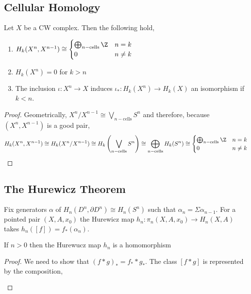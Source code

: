 \documentclass[12pt]{extarticle}
\begin{document}
\subsection{Cellular Homology}

\begin{lemma}
Let $X$ be a CW complex. Then the following hold,
\begin{enumerate}
\item $H_k (X^n, X^{n-1}) \cong
\begin{cases}
\bigoplus_{n-\text{cells}} \Z & n = k \\
0 & n \neq k 
\end{cases} $

\item $H_k(X^n) = 0$ for $k > n$ 

\item The inclusion $\iota : X^n \to X$ induces $\iota_* : H_k(X^n) \to H_k(X)$ an isomorphism if $k < n$.
\end{enumerate}
\end{lemma}

\begin{proof}
Geometrically, $X^n / X^{n-1} \cong \bigvee_{n-\text{cells}} S^n$ and therefore, because $(X^n, X^{n-1})$ is a good pair,
\[ H_k (X^n, X^{n-1}) \cong H_k(X^n / X^{n-1}) \cong H_k \left( \bigvee_{n-\text{cells}} S^n \right) \cong \bigoplus_{n-\text{cells}} H_k(S^n) \cong
\begin{cases}
\bigoplus_{n-\text{cells}} \Z & n = k \\
0 & n \neq k 
\end{cases} \]
\end{proof}


\subsection{The Hurewicz Theorem}

\begin{definition}
Fix generators $\alpha$ of $H_n(D^n, \partial D^n) \cong H_n(S^n)$ such that $\alpha_n = \Sigma \alpha_{n-1}$. For a pointed pair $(X, A, x_0)$ the Hurewicz map $h_n : \pi_n(X, A, x_0) \to H_n(X, A)$ takes $h_n([f]) = f_*(\alpha_n)$. 
\end{definition}

\begin{lemma}
If $n > 0$ then the Hurewucz map $h_n$ is a homomorphism
\end{lemma}

\begin{proof}
We need to show that $(f * g)_* = f_* * g_*$. The class $[f * g]$ is represented by the composition,
\begin{center}
\end{center} 
\end{proof}
\end{document}
